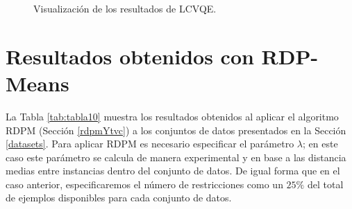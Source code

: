 \begin{figure}[bth]
	\myfloatalign
	\caption{Visualización de los resultados de \acs{LCVQE}.}\label{fig:figure26}
\end{figure}

\clearpage

\section{Resultados obtenidos con RDP-Means}

La Tabla \ref{tab:tabla10} muestra los resultados obtenidos al aplicar el algoritmo \acf{RDPM} (Sección \ref{rdpmYtvc}) a los conjuntos de datos presentados en la Sección \ref{datasets}. Para aplicar \acs{RDPM} es necesario especificar el parámetro $\lambda$; en este caso este parámetro se calcula de manera experimental y en base a las distancia medias entre instancias dentro del conjunto de datos. De igual forma que en el caso anterior, especificaremos el número de restricciones como un $25\%$ del total de ejemplos disponibles para cada conjunto de datos.

